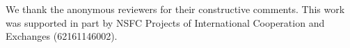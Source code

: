 \begin{acks}
    We thank the anonymous reviewers for their constructive comments.
    This work was supported in part by NSFC Projects of International Cooperation and Exchanges (62161146002).
\end{acks}
    